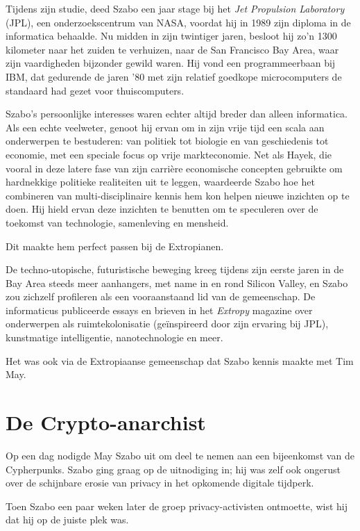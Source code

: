 \documentclass[
  a5paper,
  smalldemyvopaper,11pt,twoside,onecolumn,openright,extrafontsizes]{memoir}
\begin{document}
Tijdens zijn studie, deed Szabo een jaar stage bij het \emph{Jet
Propulsion Laboratory} (JPL), een onderzoekscentrum van NASA, voordat
hij in 1989 zijn diploma in de informatica behaalde. Nu midden in zijn
twintiger jaren, besloot hij zo'n 1300 kilometer naar het zuiden te
verhuizen, naar de San Francisco Bay Area, waar zijn vaardigheden
bijzonder gewild waren. Hij vond een programmeerbaan bij IBM, dat
gedurende de jaren '80 met zijn relatief goedkope microcomputers de
standaard had gezet voor thuiscomputers.

Szabo's persoonlijke interesses waren echter altijd breder dan alleen
informatica. Als een echte veelweter, genoot hij ervan om in zijn vrije
tijd een scala aan onderwerpen te bestuderen: van politiek tot biologie
en van geschiedenis tot economie, met een speciale focus op vrije
markteconomie. Net als Hayek, die vooral in deze latere fase van zijn
carrière economische concepten gebruikte om hardnekkige politieke
realiteiten uit te leggen, waardeerde Szabo hoe het combineren van
multi-disciplinaire kennis hem kon helpen nieuwe inzichten op te doen.
Hij hield ervan deze inzichten te benutten om te speculeren over de
toekomst van technologie, samenleving en mensheid.

Dit maakte hem perfect passen bij de Extropianen.

De techno-utopische, futuristische beweging kreeg tijdens zijn eerste
jaren in de Bay Area steeds meer aanhangers, met name in en rond Silicon
Valley, en Szabo zou zichzelf profileren als een vooraanstaand lid van
de gemeenschap. De informaticus publiceerde essays en brieven in het
\emph{Extropy} magazine over onderwerpen als ruimtekolonisatie
(geïnspireerd door zijn ervaring bij JPL), kunstmatige intelligentie,
nanotechnologie en meer.

Het was ook via de Extropiaanse gemeenschap dat Szabo kennis maakte met
Tim May.

\section{De Crypto-anarchist}\label{de-crypto-anarchist}

Op een dag nodigde May Szabo uit om deel te nemen aan een bijeenkomst
van de Cypherpunks. Szabo ging graag op de uitnodiging in; hij was zelf
ook ongerust over de schijnbare erosie van privacy in het opkomende
digitale tijdperk.

Toen Szabo een paar weken later de groep privacy-activisten ontmoette,
wist hij dat hij op de juiste plek was.
\end{document}
